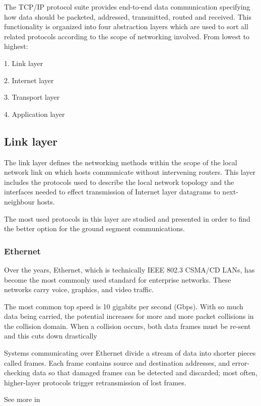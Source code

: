 The TCP/IP protocol suite provides end-to-end data communication specifying how data should be packeted, addressed, transmitted, routed and received. This functionality is organized into four abstraction layers which are used to sort all related protocols according to the scope of networking involved. From lowest to highest:
\begin{list}{}{}
\item 1. Link layer
\item 2. Internet layer
\item 3. Transport layer
\item 4. Application layer
\end{list}

\subsection{Link layer}
The link layer defines the networking methods within the scope of the local network link on which hosts communicate without intervening routers. This layer includes the protocols used to describe the local network topology and the interfaces needed to effect transmission of Internet layer datagrams to next-neighbour hosts. 

The most used protocols in this layer are studied and presented in order to find the better option for the ground segment communications.

\subsubsection{Ethernet}
Over the years, Ethernet, which is technically IEEE 802.3 CSMA/CD LANs, has become the most commonly used standard for enterprise networks. These networks carry voice, graphics, and video traffic.

The most common top speed is 10 gigabits per second (Gbps). With so much data being carried, the potential increases for more and more packet collisions in the collision domain. When a collision occurs, both data frames must be re-sent and this cuts down drastically 

Systems communicating over Ethernet divide a stream of data into shorter pieces called frames. Each frame contains source and destination addresses, and error-checking data so that damaged frames can be detected and discarded; most often, higher-layer protocols trigger retransmission of lost frames.

See more in \cite{Ethernet}

